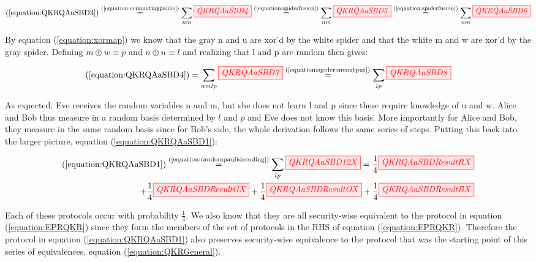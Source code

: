 \documentclass[]{article}
\newcommand{\equaltext}[1]{\ensuremath{\stackrel{\text{#1}}{=}}}
\begin{document}
\begin{equation}
\label{equation:QKRQAaSBD4}
(\ref{equation:QKRQAaSBD3}) \equaltext{(\ref{equation:commutingpaulis})} \sum\limits_{nm}\tikzfig{QKRQAaSBD4} \equaltext{(\ref{equation:spiderfusion})} \sum\limits_{nm}\tikzfig{QKRQAaSBD5} \equaltext{(\ref{equation:spiderfusion})} \sum\limits_{nm}\tikzfig{QKRQAaSBD6} 
\end{equation}

By equation (\ref{equation:xormap}) we know that the gray n and u are xor'd by the white spider and that the white m and w are xor'd by the gray spider. Defining $m \oplus w \equiv p$ and $n \oplus u \equiv l$ and realizing that l and p are random then gives:

\begin{equation}
	\label{equation:randompaulidecoding}
	(\ref{equation:QKRQAaSBD4}) = 
	\sum\limits_{nmlp}\tikzfig{QKRQAaSBD7} \equaltext{(\ref{equation:spideroneoutput})} \sum\limits_{lp}\tikzfig{QKRQAaSBD8}
\end{equation}

As expected, Eve receives the random variables n and m, but she does not learn l and p since these require knowledge of u and w. Alice and Bob thus measure in a random basis determined by $l$ and $p$ and Eve does not know this basis. More importantly for Alice and Bob, they measure in the same random basis since for Bob's side, the whole derivation follows the same series of steps. Putting this back into the larger picture, equation (\ref{equation:QKRQAaSBD1}):

\begin{equation}
	\label{equation:QKRQAaSBDResult}
	\begin{aligned}
	(\ref{equation:QKRQAaSBD1}) \equaltext{(\ref{equation:randompaulidecoding})}
	\sum\limits_{lp}\tikzfig{QKRQAaSBD12X} 
	=
	 \frac{1}{4}\tikzfig{QKRQAaSBDResultRX} \\+
	\frac{1}{4}\tikzfig{QKRQAaSBDResultGX} +
	\frac{1}{4}\tikzfig{QKRQAaSBDResultOX} +
	\frac{1}{4}\tikzfig{QKRQAaSBDResultBX}
	\end{aligned}
\end{equation}

Each of these protocols occur with probability $\frac{1}{4}$. We also know that they are all security-wise equivalent to the protocol in equation (\ref{equation:EPRQKR}) since they form the members of the set of protocols in the RHS of equation (\ref{equation:EPRQKR}). Therefore the protocol in equation (\ref{equation:QKRQAaSBD1}) also preserves security-wise equivalence to the protocol that was the starting point of this series of equivalences, equation (\ref{equation:QKRGeneral}).
\end{document}

